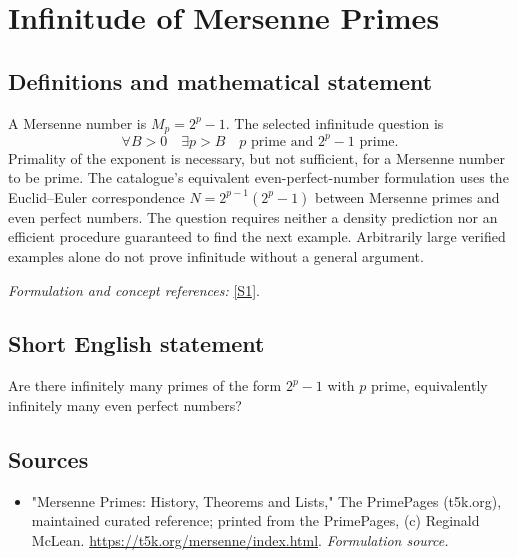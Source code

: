 \documentclass[11pt]{article}
\begin{document}
\section*{\texorpdfstring{Infinitude of Mersenne Primes}{Infinitude of Mersenne Primes}}\label{261}
\subsection{Definitions and mathematical statement}
A Mersenne number is $M_p=2^p-1$. The selected infinitude question is
\[
 \forall B>0\quad\exists p>B\quad
 p\text{ prime and }2^p-1\text{ prime}.
\]
Primality of the exponent is necessary, but not sufficient, for a Mersenne number to be prime. The catalogue's equivalent even-perfect-number formulation uses the Euclid--Euler correspondence
$N=2^{p-1}(2^p-1)$ between Mersenne primes and even perfect numbers. The question requires neither a density prediction nor an efficient procedure guaranteed to find the next example. Arbitrarily large verified examples alone do not prove infinitude without a general argument.
\par\smallskip\textit{Formulation and concept references:} \href{https://t5k.org/mersenne/index.html}{[S1]}.

\subsection{Short English statement}
Are there infinitely many primes of the form $2^p-1$ with $p$ prime, equivalently infinitely many even perfect numbers?
\subsection{Sources}
\begin{itemize}
\item[S1]"Mersenne Primes: History, Theorems and Lists," The PrimePages (t5k.org), maintained curated reference; printed from the PrimePages, (c) Reginald McLean.
\url{https://t5k.org/mersenne/index.html}.
\textit{Formulation source.}
\end{itemize}
\end{document}
